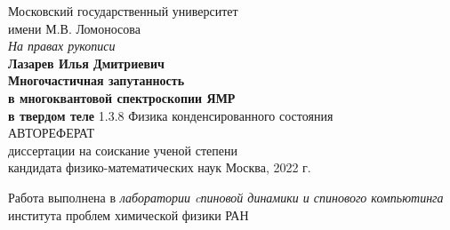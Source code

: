 \begin{titlepage}
\vfill
\begin{center}
  {\large
    Московский государственный университет \\
    имени М.В. Ломоносова
  } \\
  \vfill
  \hfill \textit{На правах рукописи} \\
  \vfill
  {\Large \bf Лазарев Илья Дмитриевич} \\
  \vspace{1cm}
  {\Large \bf
      Многочастичная запутанность \\
      в многоквантовой спектроскопии ЯМР \\
      \vspace{2mm}
      в твердом теле
  }
 \vfill
  1.3.8 Физика конденсированного состояния \\
 \vspace{1cm}
 АВТОРЕФЕРАТ \\
 диссертации на соискание ученой степени \\
 кандидата физико-математических наук
 \vfill
 Москва, 2022 г.
\end{center}
\end{titlepage}

Работа выполнена в \textit{лаборатории cпиновой динамики и спинового компьютинга} института проблем химической физики РАН

